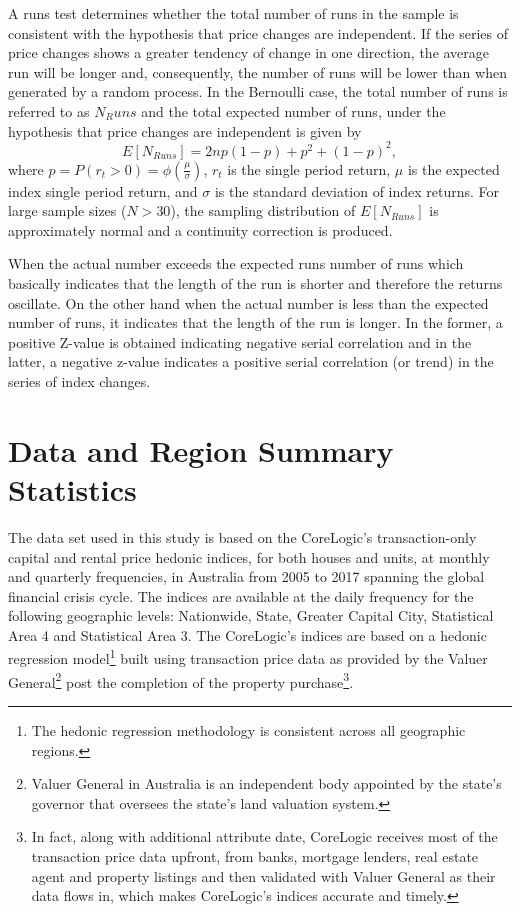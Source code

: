 \documentclass[AEJ,reqno, draftmode]{AEA}
\begin{document}
A runs test determines whether the total number of runs in the sample is consistent with the hypothesis that price changes are independent. If the series of price changes shows a greater tendency of change in one direction, the average run will be longer and, consequently, the number of runs will be lower than when generated by a random process. In the Bernoulli case, the total number of runs is referred to as $N_Runs$ and the total expected number of runs, under the hypothesis that price changes are independent is given by
\begin{equation}
    E[N_{Runs}] = 2np (1-p) + p^2 + (1- p)^2,
\end{equation}where $p = P(r_t>0) = \phi \left(\frac{\mu}{\sigma}\right)$, $r_t$ is the single period return,  $\mu$ is the expected index single period return, and $\sigma$ is the standard deviation of index returns. For large sample sizes ($N>30$), the sampling distribution of $E[N_{Runs}]$ is approximately normal and a continuity correction is produced.

When the actual number exceeds the expected runs number of runs which basically indicates that the length of the run is shorter and therefore the returns oscillate. On the other hand when the actual number is less than the expected number of runs, it indicates that the length of the run is longer. In the former, a positive Z-value is obtained indicating negative serial correlation and in the latter, a negative z-value indicates a positive serial correlation (or trend) in the series of index changes.

\section{Data and Region Summary Statistics}

The data set used in this study is based on the CoreLogic's transaction-only capital and rental price hedonic indices, for both houses and units, at monthly and quarterly frequencies, in Australia from 2005 to 2017 spanning the global financial crisis cycle. The indices are available at the daily frequency for the following geographic levels: Nationwide, State, Greater Capital City, Statistical Area 4 and Statistical Area 3. The CoreLogic's indices are based on a hedonic regression model\footnote{The hedonic regression methodology is consistent across all geographic regions.} built using transaction price data as provided by the Valuer General\footnote{Valuer General in Australia is an independent body appointed by the state's governor that oversees the state's land valuation system.} post the completion of the property purchase\footnote{In fact, along with additional attribute date, CoreLogic receives most of the transaction price data upfront, from banks, mortgage lenders, real estate agent and property listings and then validated with Valuer General as their data flows in, which makes CoreLogic's indices accurate and timely.}. 
\end{document}
